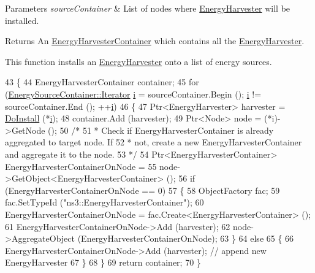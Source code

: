 \begin{DoxyParams}{Parameters}
{\em source\+Container} & List of nodes where \hyperlink{classns3_1_1EnergyHarvester}{Energy\+Harvester} will be installed. \\
\hline
\end{DoxyParams}
\begin{DoxyReturn}{Returns}
An \hyperlink{classns3_1_1EnergyHarvesterContainer}{Energy\+Harvester\+Container} which contains all the \hyperlink{classns3_1_1EnergyHarvester}{Energy\+Harvester}.
\end{DoxyReturn}
This function installs an \hyperlink{classns3_1_1EnergyHarvester}{Energy\+Harvester} onto a list of energy sources. 
\begin{DoxyCode}
43 \{
44   EnergyHarvesterContainer container;
45   \textcolor{keywordflow}{for} (\hyperlink{classns3_1_1EnergySourceContainer_a4aef37787572d18785778ee20b003b2a}{EnergySourceContainer::Iterator} \hyperlink{bernuolliDistribution_8m_a6f6ccfcf58b31cb6412107d9d5281426}{i} = sourceContainer.Begin (); 
      \hyperlink{bernuolliDistribution_8m_a6f6ccfcf58b31cb6412107d9d5281426}{i} != sourceContainer.End (); ++\hyperlink{bernuolliDistribution_8m_a6f6ccfcf58b31cb6412107d9d5281426}{i})
46   \{
47     Ptr<EnergyHarvester> harvester = \hyperlink{classns3_1_1EnergyHarvesterHelper_a9d54564236aeb9d55c8126c1ab720655}{DoInstall} (*\hyperlink{bernuolliDistribution_8m_a6f6ccfcf58b31cb6412107d9d5281426}{i});
48     container.Add (harvester);
49     Ptr<Node> node = (*i)->GetNode ();
50     \textcolor{comment}{/*}
51 \textcolor{comment}{     * Check if EnergyHarvesterContainer is already aggregated to target node. If}
52 \textcolor{comment}{     * not, create a new EnergyHarvesterContainer and aggregate it to the node.}
53 \textcolor{comment}{     */}
54     Ptr<EnergyHarvesterContainer> EnergyHarvesterContainerOnNode =
55     node->GetObject<EnergyHarvesterContainer> ();
56     \textcolor{keywordflow}{if} (EnergyHarvesterContainerOnNode == 0)
57     \{
58       ObjectFactory fac;
59       fac.SetTypeId (\textcolor{stringliteral}{"ns3::EnergyHarvesterContainer"});
60       EnergyHarvesterContainerOnNode = fac.Create<EnergyHarvesterContainer> ();
61       EnergyHarvesterContainerOnNode->Add (harvester);
62       node->AggregateObject (EnergyHarvesterContainerOnNode);
63     \}
64     \textcolor{keywordflow}{else}
65     \{
66       EnergyHarvesterContainerOnNode->Add (harvester);  \textcolor{comment}{// append new EnergyHarvester}
67     \}
68   \}
69   \textcolor{keywordflow}{return} container;
70 \}
\end{DoxyCode}


